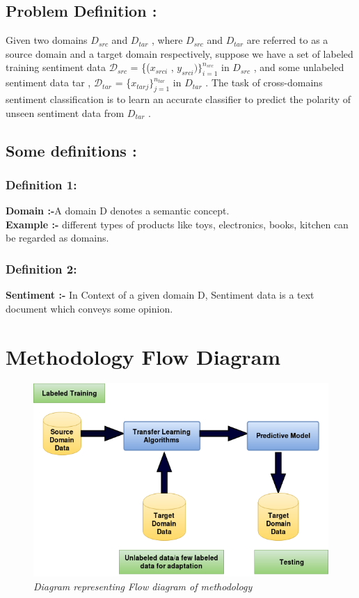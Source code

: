 \documentclass{report}
\begin{document}
\section{Problem Definition :}
Given two domains \(D_{src}\) and \(D_{tar}\) , where \(D_{src}\) and \(D_{tar}\) are referred to as a source domain and a target domain respectively, suppose we have a set of labeled training sentiment data \(\mathcal{D}_{src}\) = \{(\(x_{src i}\)  , \(y_{src i} )\}_{i=1}^{n_{src}}\) in \(D_{src}\) , and some unlabeled sentiment data tar , \(\mathcal{D}_{tar}\) = \{\(x_{tar j} \}_{j=1}^{n_{tar}}\) in \(D_{tar}\) . The task of cross-domains sentiment classification is to learn an accurate classifier to predict the polarity of unseen sentiment data from \(D_{tar}\) .\\
\linebreak
\section{Some definitions :}
\subsection{Definition 1:}
\textbf{Domain :-}A domain D denotes a semantic concept.\\
\textbf{Example :-} different types of products like toys, electronics, books, kitchen can be regarded as domains.\\
\subsection{Definition 2:}
\textbf{Sentiment :-} In Context of a given domain D, Sentiment data is a text document which conveys some opinion. 

\chapter*{Methodology Flow Diagram}
\vspace{100pt}
\begin{figure}[!h]
	\includegraphics[width=1.1\linewidth]{Methodology.png}
	\caption{\textit{Diagram representing Flow diagram of methodology}}
	\label{Fig:1}
\end{figure}
\end{document}
